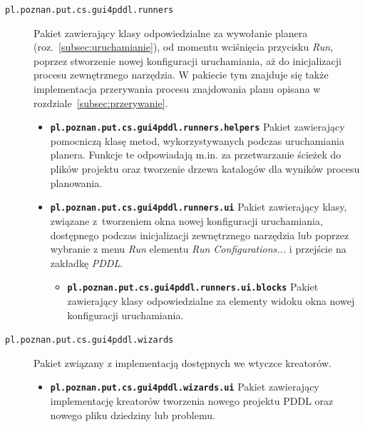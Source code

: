 \begin{description}
\begin{itemize}
\end{itemize}
\item [\texttt{pl.poznan.put.cs.gui4pddl.runners}] Pakiet zawierający klasy odpowiedzialne za wywołanie planera (roz.~\ref{subsec:uruchamianie}), od momentu wciśnięcia przycisku \textit{Run}, poprzez stworzenie nowej konfiguracji uruchamiania, aż do inicjalizacji procesu zewnętrznego narzędzia. W pakiecie tym znajduje się także implementacja przerywania procesu znajdowania planu opisana w rozdziale~\ref{subsec:przerywanie}.
\begin{itemize}
\item \texttt{\textbf{pl.poznan.put.cs.gui4pddl.runners.helpers}} Pakiet zawierający pomocniczą kla\-sę metod, wykorzystywanych podczas uruchamiania planera. Funkcje te odpowiadają m.in. za przetwarzanie ścieżek do plików projektu oraz tworzenie drzewa katalogów dla wyników procesu planowania.
\item \texttt{\textbf{pl.poznan.put.cs.gui4pddl.runners.ui}} Pakiet zawierający klasy, związane z~tworzeniem okna nowej konfiguracji uruchamiania, dostępnego podczas inicjalizacji zewnętrznego narzędzia lub poprzez wybranie z menu \textit{Run} elementu \textit{Run Configurations...} i przejście na zakładkę \textit{PDDL}.
\begin{itemize}
\item \texttt{\textbf{pl.poznan.put.cs.gui4pddl.runners.ui.blocks}} Pakiet zawierający klasy odpowiedzialne za elementy widoku okna nowej konfiguracji uruchamiania.
\end{itemize}
\end{itemize}
\item [\texttt{pl.poznan.put.cs.gui4pddl.wizards}] Pakiet związany z implementacją dostępnych we wty\-czce kreatorów.
\begin{itemize}
\item \texttt{\textbf{pl.poznan.put.cs.gui4pddl.wizards.ui}} Pakiet zawierający implementację kreatorów tworzenia nowego projektu PDDL oraz nowego pliku dziedziny lub problemu.
\end{itemize}
\end{description}
